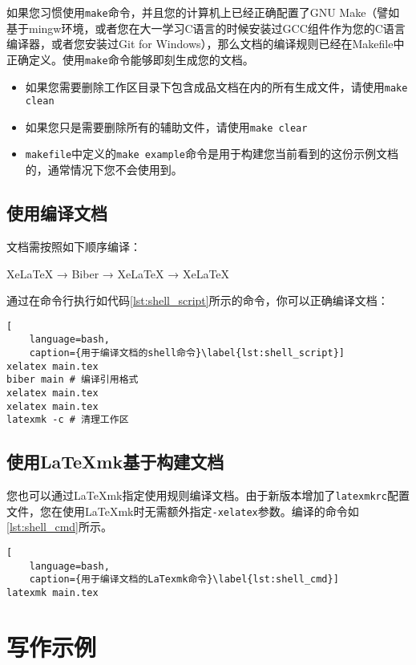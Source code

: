 如果您习惯使用\texttt{make}命令，并且您的计算机上已经正确配置了GNU Make（譬如基于mingw环境，或者您在大一学习C语言的时候安装过GCC组件作为您的C语言编译器，或者您安装过Git for Windows），那么文档的编译规则已经在Makefile中正确定义。使用\texttt{make}命令能够即刻生成您的文档。

\begin{itemize}
    \item 如果您需要删除工作区目录下包含成品文档在内的所有生成文件，请使用\texttt{make clean}
    \item 如果您只是需要删除所有的辅助文件，请使用\texttt{make clear}
    \item \texttt{makefile}中定义的\texttt{make example}命令是用于构建您当前看到的这份示例文档的，通常情况下您不会使用到。
\end{itemize}

\subsection{使用\XeLaTeX 编译文档}

文档需按照如下顺序编译：

XeLaTeX → Biber → XeLaTeX → XeLaTeX

通过在命令行执行如代码\ref{lst:shell_script}所示的命令，你可以正确编译文档：

\begin{lstlisting}[
    language=bash,
    caption={用于编译文档的shell命令}\label{lst:shell_script}]
xelatex main.tex
biber main # 编译引用格式
xelatex main.tex
xelatex main.tex
latexmk -c # 清理工作区
\end{lstlisting}

\subsection{使用\LaTeX{}mk基于\XeLaTeX 构建文档}

您也可以通过\LaTeX{}mk指定使用\XeLaTeX 规则编译文档。由于新版本增加了\texttt{latexmkrc}配置文件，您在使用\LaTeX{}mk时无需额外指定\texttt{-xelatex}参数。编译的命令如\ref{lst:shell_cmd}所示。

\begin{lstlisting}[
    language=bash,
    caption={用于编译文档的LaTexmk命令}\label{lst:shell_cmd}]
latexmk main.tex
\end{lstlisting}

\section{写作示例}


